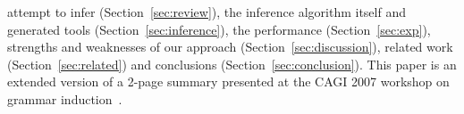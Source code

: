 attempt to infer (Section~\ref{sec:review}), the inference
algorithm itself and generated tools (Section~\ref{sec:inference}), 
the performance (Section~\ref{sec:exp}), strengths and 
weaknesses of our approach (Section~\ref{sec:discussion}),
related work (Section~\ref{sec:related}) and 
conclusions (Section~\ref{sec:conclusion}).
This paper is an extended version of a 2-page
summary presented at the CAGI 2007 workshop on grammar 
induction~\cite{burke+:cagi07}. 






